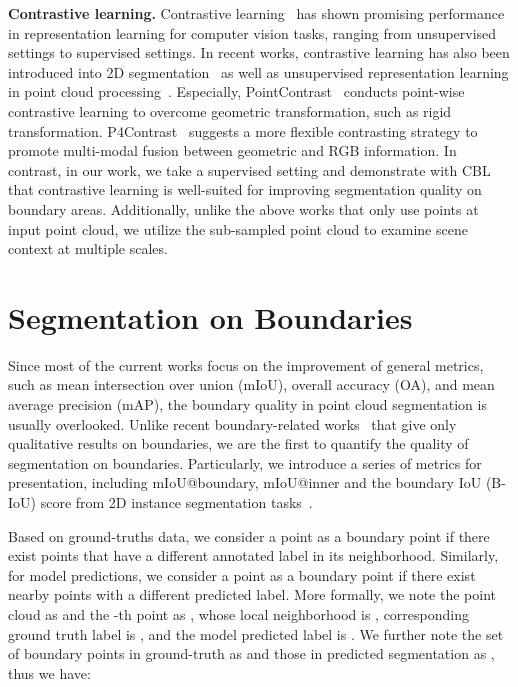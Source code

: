 \documentclass[10pt,twocolumn,letterpaper]{article}
\begin{document}
\noindent\textbf{Contrastive learning.}
Contrastive learning~\cite{infonce, softnn, supcon, others_regioncl, moco, cont_simple} has shown promising performance in representation learning for computer vision tasks, ranging from unsupervised settings to supervised settings. In recent works, 
contrastive learning has also been introduced into 2D segmentation~\cite{imgcl_dense, imgcl_glb} as well as unsupervised representation learning in point cloud processing~\cite{pointcontrast, p4contrast, contrastscene}.
Especially, PointContrast~\cite{pointcontrast} conducts point-wise contrastive learning to overcome geometric transformation, such as rigid transformation. 
P4Contrast~\cite{p4contrast} suggests a more flexible contrasting strategy to promote multi-modal fusion between geometric and RGB information. In contrast, in our work, we take a supervised setting and demonstrate with CBL that contrastive learning is well-suited for improving segmentation quality on boundary areas. Additionally, unlike the above works that only use points at input point cloud, we utilize the sub-sampled point cloud to examine scene context at multiple scales.

\section{Segmentation on Boundaries}
\label{sec:metric}

Since most of the current works focus on the improvement of general metrics, such as mean intersection over union (mIoU), overall accuracy (OA), and mean average precision (mAP), the boundary quality in point cloud segmentation is usually overlooked. Unlike recent boundary-related works~\cite{bound_3d_pred,bound_3d_jse} that give only qualitative results on boundaries, we are the first to quantify the quality of segmentation on boundaries. Particularly, we introduce a series of metrics for presentation, including mIoU@boundary, mIoU@inner and the boundary IoU (B-IoU) score from 2D instance segmentation tasks~\cite{bound_iou}.

Based on ground-truths data, we consider a point as a boundary point if there exist points that have a different annotated label in its neighborhood. Similarly, for model predictions, we consider a point as a boundary point if there exist nearby points with a different predicted label.
More formally, we note the point cloud as  and the -th point as , whose local neighborhood is , corresponding ground truth label is , and the model predicted label is . We further note the set of boundary points in ground-truth as  and those in predicted segmentation as , thus we have:
\end{document}
